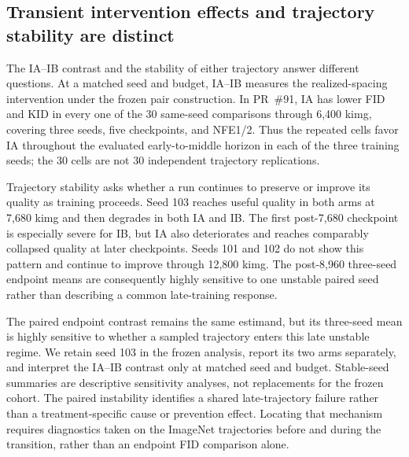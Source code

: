 \subsection{Transient intervention effects and trajectory stability are distinct}
\label{sec:transient-intervention-vs-stability}

The IA--IB contrast and the stability of either trajectory answer different
questions.  At a matched seed and budget, IA--IB measures the realized-spacing
intervention under the frozen pair construction.  In PR~\#91, IA has lower
FID and KID in every one of the 30 same-seed comparisons through 6,400 kimg,
covering three seeds, five checkpoints, and NFE1/2.  Thus the repeated cells
favor IA throughout the evaluated early-to-middle horizon in each of the three
training seeds; the 30 cells are not 30 independent trajectory replications.

Trajectory stability asks whether a run continues to preserve or improve its
quality as training proceeds.  Seed 103 reaches useful quality in both arms at
7,680 kimg and then degrades in both IA and IB.  The first post-7,680 checkpoint
is especially severe for IB, but IA also deteriorates and reaches comparably
collapsed quality at later checkpoints.  Seeds 101 and 102 do not show this
pattern and continue to improve through 12,800 kimg.  The post-8,960
three-seed endpoint means are consequently highly sensitive to one unstable
paired seed rather than describing a common late-training response.

The paired endpoint contrast remains the same estimand, but its three-seed mean
is highly sensitive to whether a sampled trajectory enters this late unstable
regime.  We retain seed 103 in the frozen analysis, report its two arms
separately, and interpret the IA--IB contrast only at matched seed and budget.
Stable-seed summaries are descriptive sensitivity analyses, not replacements
for the frozen cohort.
The paired instability identifies a shared late-trajectory failure rather than
a treatment-specific cause or prevention effect.  Locating that mechanism
requires diagnostics taken on the ImageNet
trajectories before and during the transition, rather than an endpoint FID
comparison alone.
